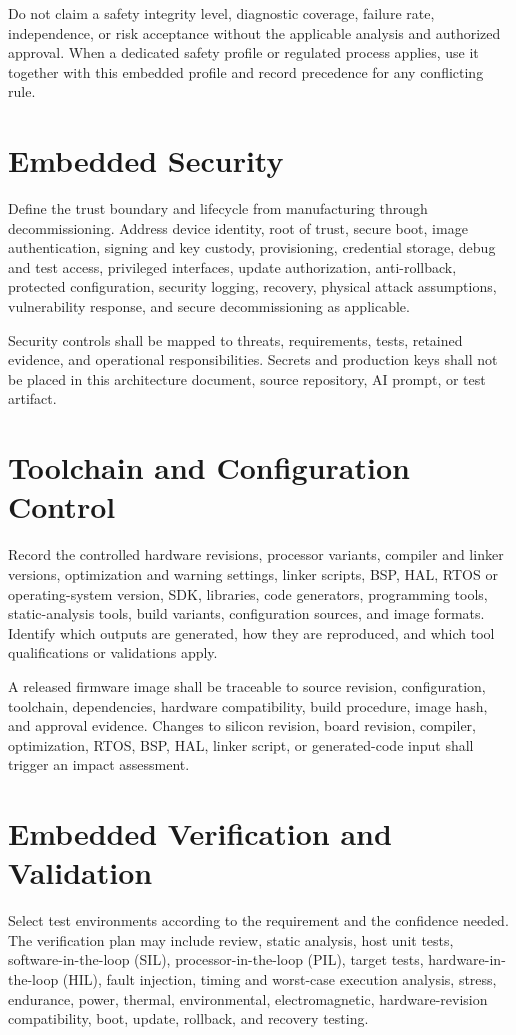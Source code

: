Do not claim a safety integrity level, diagnostic coverage, failure rate,
independence, or risk acceptance without the applicable analysis and
authorized approval. When a dedicated safety profile or regulated process
applies, use it together with this embedded profile and record precedence for
any conflicting rule.

\section{Embedded Security}
Define the trust boundary and lifecycle from manufacturing through
decommissioning. Address device identity, root of trust, secure boot, image
authentication, signing and key custody, provisioning, credential storage,
debug and test access, privileged interfaces, update authorization,
anti-rollback, protected configuration, security logging, recovery, physical
attack assumptions, vulnerability response, and secure decommissioning as
applicable.

Security controls shall be mapped to threats, requirements, tests, retained
evidence, and operational responsibilities. Secrets and production keys shall
not be placed in this architecture document, source repository, AI prompt, or
test artifact.

\section{Toolchain and Configuration Control}
Record the controlled hardware revisions, processor variants, compiler and
linker versions, optimization and warning settings, linker scripts, BSP, HAL,
RTOS or operating-system version, SDK, libraries, code generators, programming
tools, static-analysis tools, build variants, configuration sources, and image
formats. Identify which outputs are generated, how they are reproduced, and
which tool qualifications or validations apply.

A released firmware image shall be traceable to source revision, configuration,
toolchain, dependencies, hardware compatibility, build procedure, image hash,
and approval evidence. Changes to silicon revision, board revision, compiler,
optimization, RTOS, BSP, HAL, linker script, or generated-code input shall
trigger an impact assessment.

\section{Embedded Verification and Validation}
Select test environments according to the requirement and the confidence
needed. The verification plan may include review, static analysis, host unit
tests, software-in-the-loop (SIL), processor-in-the-loop (PIL), target tests,
hardware-in-the-loop (HIL), fault injection, timing and worst-case execution
analysis, stress, endurance, power, thermal, environmental, electromagnetic,
hardware-revision compatibility, boot, update, rollback, and recovery testing.

